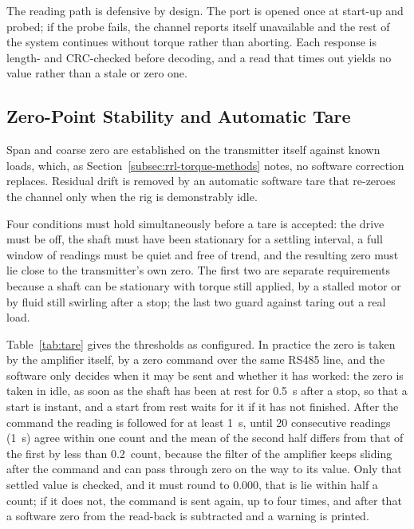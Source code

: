 The reading path is defensive by design. The port is opened once at start-up and probed; if the probe fails, the channel reports itself unavailable and the rest of the system continues without torque rather than aborting. Each response is length- and CRC-checked before decoding, and a read that times out yields no value rather than a stale or zero one.

\subsection{Zero-Point Stability and Automatic Tare}
\label{subsec:agit-tare}

Span and coarse zero are established on the transmitter itself against known loads, which, as Section~\ref{subsec:rrl-torque-methods} notes, no software correction replaces. Residual drift is removed by an automatic software tare that re-zeroes the channel only when the rig is demonstrably idle.

Four conditions must hold simultaneously before a tare is accepted: the drive must be off, the shaft must have been stationary for a settling interval, a full window of readings must be quiet and free of trend, and the resulting zero must lie close to the transmitter's own zero. The first two are separate requirements because a shaft can be stationary with torque still applied, by a stalled motor or by fluid still swirling after a stop; the last two guard against taring out a real load.

Table~\ref{tab:tare} gives the thresholds as configured. In practice the zero is taken by the amplifier itself, by a zero command over the same RS485 line, and the software only decides when it may be sent and whether it has worked: the zero is taken in idle, as soon as the shaft has been at rest for 0.5~s after a stop, so that a start is instant, and a start from rest waits for it if it has not finished. After the command the reading is followed for at least 1~s, until 20 consecutive readings (1~s) agree within one count and the mean of the second half differs from that of the first by less than 0.2~count, because the filter of the amplifier keeps sliding after the command and can pass through zero on the way to its value. Only that settled value is checked, and it must round to 0.000, that is lie within half a count; if it does not, the command is sent again, up to four times, and after that a software zero from the read-back is subtracted and a warning is printed.

